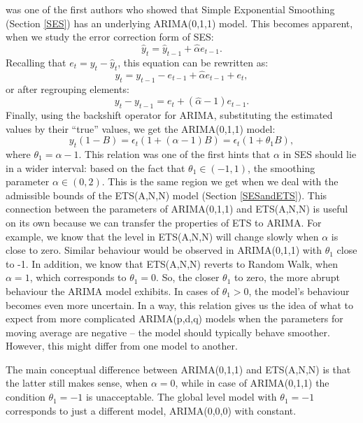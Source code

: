 \documentclass[]{book}
\theoremstyle{definition}
\theoremstyle{definition}
\theoremstyle{definition}
\theoremstyle{definition}
\theoremstyle{remark}
\begin{document}
\citet{Muth1960} was one of the first authors who showed that Simple Exponential Smoothing (Section \ref{SES}) has an underlying ARIMA(0,1,1) model. This becomes apparent, when we study the error correction form of SES:
\begin{equation*}
  \hat{y}_{t} = \hat{y}_{t-1} + \hat{\alpha} e_{t-1}.
\end{equation*}
Recalling that \(e_t=y_t-\hat{y}_t\), this equation can be rewritten as:
\begin{equation*}
  y_{t} = y_{t-1} -e_{t-1} + \hat{\alpha} e_{t-1} + e_t,
\end{equation*}
or after regrouping elements:
\begin{equation*}
  y_{t} -y_{t-1} = e_t + (\hat{\alpha} -1) e_{t-1}.
\end{equation*}
Finally, using the backshift operator for ARIMA, substituting the estimated values by their ``true'' values, we get the ARIMA(0,1,1) model:
\begin{equation*}
  y_{t}(1 -B) = \epsilon_t(1 + (\alpha -1) B) = \epsilon_t(1 + \theta_1 B),
\end{equation*}
where \(\theta_1 = \alpha-1\). This relation was one of the first hints that \(\alpha\) in SES should lie in a wider interval: based on the fact that \(\theta_1 \in (-1, 1)\), the smoothing parameter \(\alpha \in (0, 2)\). This is the same region we get when we deal with the admissible bounds of the ETS(A,N,N) model (Section \ref{SESandETS}). This connection between the parameters of ARIMA(0,1,1) and ETS(A,N,N) is useful on its own because we can transfer the properties of ETS to ARIMA. For example, we know that the level in ETS(A,N,N) will change slowly when \(\alpha\) is close to zero. Similar behaviour would be observed in ARIMA(0,1,1) with \(\theta_1\) close to -1. In addition, we know that ETS(A,N,N) reverts to Random Walk, when \(\alpha=1\), which corresponds to \(\theta_1=0\). So, the closer \(\theta_1\) to zero, the more abrupt behaviour the ARIMA model exhibits. In cases of \(\theta_1>0\), the model's behaviour becomes even more uncertain. In a way, this relation gives us the idea of what to expect from more complicated ARIMA(p,d,q) models when the parameters for moving average are negative -- the model should typically behave smoother. However, this might differ from one model to another.

The main conceptual difference between ARIMA(0,1,1) and ETS(A,N,N) is that the latter still makes sense, when \(\alpha=0\), while in case of ARIMA(0,1,1) the condition \(\theta_1=-1\) is unacceptable. The global level model with \(\theta_1=-1\) corresponds to just a different model, ARIMA(0,0,0) with constant.
\end{document}
